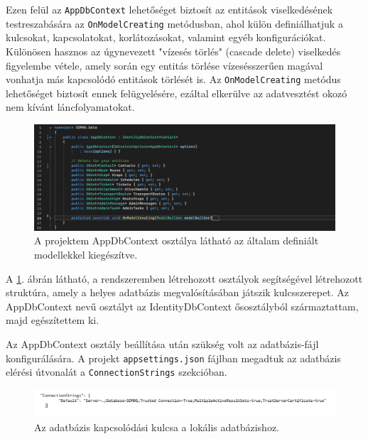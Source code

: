 Ezen felül az \texttt{AppDbContext} lehetőséget biztosít az entitások viselkedésének testreszabására az \texttt{OnModelCreating} metódusban, ahol külön definiálhatjuk a kulcsokat, kapcsolatokat, korlátozásokat, valamint egyéb konfigurációkat. Különösen hasznos az úgynevezett "vízesés törlés" (cascade delete) viselkedés figyelembe vétele, amely során egy entitás törlése vízesésszerűen magával vonhatja más kapcsolódó entitások törlését is. Az \texttt{OnModelCreating} metódus lehetőséget biztosít ennek felügyelésére, ezáltal elkerülve az adatvesztést okozó nem kívánt láncfolyamatokat.

\begin{figure}[H]
\centering
\includegraphics[width=1\textwidth]{Szakdolgozat/Mellekletek/AppDbContext.PNG}
\caption{A projektem AppDbContext osztálya látható az általam definiált modellekkel kiegészítve. }
\label{fig:appdbcontext}
\end{figure}

A \ref{fig:appdbcontext}. ábrán látható, a rendszeremben létrehozott osztályok segítségével létrehozott struktúra, amely a helyes adatbázis megvalósításában játszik kulcsszerepet. Az AppDbContext nevű osztályt az IdentityDbContext ősosztályból származtattam, majd egészítettem ki.
\vspace{\baselineskip}


Az AppDbContext osztály beállítása után szükség volt az adatbázis-fájl konfigurálására. A projekt \texttt{appsettings.json} fájlban megadtuk az adatbázis elérési útvonalát a \texttt{ConnectionStrings} szekcióban.

\begin{figure}[H]
\centering
\includegraphics[width=1\textwidth]{Szakdolgozat/Mellekletek/Connectionstring.PNG}
\caption{Az adatbázis kapcsolódási kulcsa a lokális adatbázishoz.}
\label{fig:connectionstring}
\end{figure}

